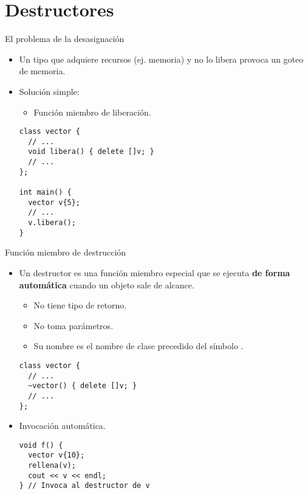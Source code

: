 \section{Destructores}

\begin{frame}[fragile]{El problema de la desasignación}
\begin{itemize}
  \item Un tipo que adquiere recursos (ej. memoria) y no lo libera provoca un goteo de memoria.
  \item Solución simple:
    \begin{itemize}
      \item Función miembro de liberación.
    \end{itemize}
\begin{lstlisting}
class vector {
  // ...
  void libera() { delete []v; }
  // ...
};

int main() {
  vector v{5};
  // ...
  v.libera();
}
\end{lstlisting}
\end{itemize}
\end{frame}

\begin{frame}[fragile]{Función miembro de destrucción}
\begin{itemize}
  \item Un \alert{destructor} es una función miembro especial que se ejecuta 
        \textbf{de forma automática} cuando un objeto sale de alcance.
    \begin{itemize}
      \item No tiene tipo de retorno.
      \item No toma parámetros.
      \item Su nombre es el nombre de clase precedido del símbolo \cppkey{\~}.
    \end{itemize}
\begin{lstlisting}
class vector {
  // ...
  ~vector() { delete []v; }
  // ...
};
\end{lstlisting}
  \item Invocación automática.
\begin{lstlisting}
void f() {
  vector v{10};
  rellena(v);
  cout << v << endl;
} // Invoca al destructor de v
\end{lstlisting}
\end{itemize}
\end{frame}

